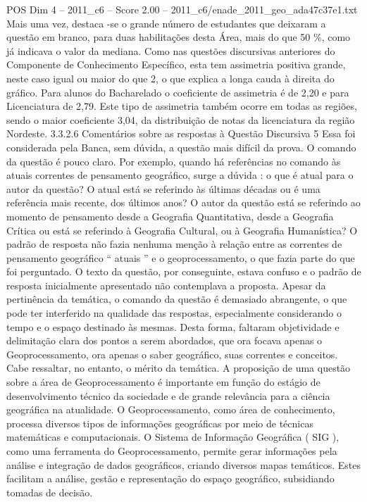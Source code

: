 \begin{textsample}{POS Dim 4 – 2011\_c6 – Score 2.00 – 2011\_c6/enade\_2011\_geo\_ada47c37e1.txt}
Mais uma vez, destaca -se o grande número de estudantes que deixaram a questão em branco, para duas habilitações desta Área, mais do que 50 \%, como já indicava o valor da mediana.
Como nas questões discursivas anteriores do Componente de Conhecimento Específico, esta tem assimetria positiva grande, neste caso igual ou maior do que 2, o que explica a longa cauda à direita do gráfico.
Para alunos do Bacharelado o coeficiente de assimetria é de 2,20 e para Licenciatura de 2,79.
Este tipo de assimetria também ocorre em todas as regiões, sendo o maior coeficiente 3,04, da distribuição de notas da licenciatura da região Nordeste. 3.3.2.6 Comentários sobre as respostas à Questão Discursiva 5 Essa foi considerada pela Banca, sem dúvida, a questão mais difícil da prova.
O comando da questão é pouco claro.
Por exemplo, quando há referências no comando às atuais correntes de pensamento geográfico, surge a dúvida : o que é atual para o autor da questão?
O atual está se referindo às últimas décadas ou é uma referência mais recente, dos últimos anos?
O autor da questão está se referindo ao momento de pensamento desde a Geografia Quantitativa, desde a Geografia Crítica ou está se referindo à Geografia Cultural, ou à Geografia Humanística?
O padrão de resposta não fazia nenhuma menção à relação entre as correntes de pensamento geográfico “ atuais ” e o geoprocessamento, o que fazia parte do que foi perguntado.
O texto da questão, por conseguinte, estava confuso e o padrão de resposta inicialmente apresentado não contemplava a proposta.
Apesar da pertinência da temática, o comando da questão é demasiado abrangente, o que pode ter interferido na qualidade das respostas, especialmente considerando o tempo e o espaço destinado às mesmas.
Desta forma, faltaram objetividade e delimitação clara dos pontos a serem abordados, que ora focava apenas o Geoprocessamento, ora apenas o saber geográfico, suas correntes e conceitos.
Cabe ressaltar, no entanto, o mérito da temática.
A proposição de uma questão sobre a área de Geoprocessamento é importante em função do estágio de desenvolvimento técnico da sociedade e de grande relevância para a ciência geográfica na atualidade.
O Geoprocessamento, como área de conhecimento, processa diversos tipos de informações geográficas por meio de técnicas matemáticas e computacionais.
O Sistema de Informação Geográfica ( SIG ), como uma ferramenta do Geoprocessamento, permite gerar informações pela análise e integração de dados geográficos, criando diversos mapas temáticos.
Estes facilitam a análise, gestão e representação do espaço geográfico, subsidiando tomadas de decisão.

\end{textsample}
